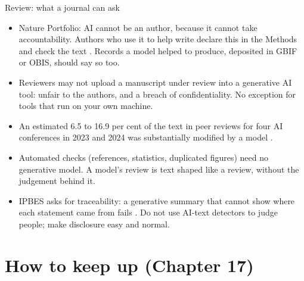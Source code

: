 \documentclass[11pt,aspectratio=169]{beamer}
\begin{document}
\begin{frame}{Review: what a journal can ask}
  \small
  \begin{itemize}
    \item Nature Portfolio: AI cannot be an author, because it cannot take
      accountability. Authors who use it to help write declare this in the
      Methods and check the text \parencite{naturemethods2026responsibly}.
      Records a model helped to produce, deposited in GBIF or OBIS, should say
      so too.
    \item Reviewers may not upload a manuscript under review into a generative
      AI tool: unfair to the authors, and a breach of confidentiality. No
      exception for tools that run on your own machine.
    \item An estimated 6.5 to 16.9 per cent of the text in peer reviews for
      four AI conferences in 2023 and 2024 was substantially modified by a
      model \parencite{liang2024peerreview}.
    \item Automated checks (references, statistics, duplicated figures) need
      no generative model. A model's review is text shaped like a review,
      without the judgement behind it.
    \item IPBES asks for traceability: a generative summary that cannot show
      where each statement came from fails \parencite{krug2026ipbes}. Do not
      use AI-text detectors to judge people; make disclosure easy and normal.
  \end{itemize}
\end{frame}

\section{How to keep up (Chapter 17)}
\end{document}

